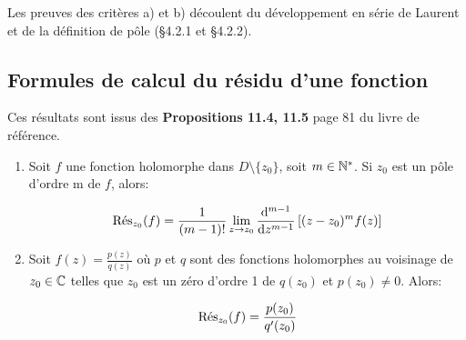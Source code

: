 \begin{remark}
    Les preuves des critères a) et b) découlent du développement en série de Laurent et de la définition de pôle (§4.2.1 et §4.2.2).
\end{remark}

\subsection{Formules de calcul du résidu d'une fonction}

\begin{note}
    Ces résultats sont issus des \textbf{Propositions 11.4, 11.5} page 81 du livre de référence.
\end{note}

\begin{method}\hfill
    
    \begin{enumerate}[label=\alph*)]
    \item 
    Soit $f$ une fonction holomorphe dans $D\setminus \{ z_0 \}$, soit $m \in \N^\ast$.
    Si $z_0$ est un pôle d'ordre m de $f$, alors:
    
    \[ \Res_{z_0}(f) = \frac{1}{(m - 1)!} \lim\limits_{z \rightarrow z_0} \frac{\dd^{m-1}}{\dz^{m - 1}} \left[ (z - z_0)^m f(z) \right] \]
    
    \item 
    Soit $f(z) = \frac{p(z)}{q(z)}$ où $p$ et $q$ sont des fonctions holomorphes au voisinage de $z_0 \in \Cx$ telles que $z_0$ est un zéro d'ordre 1 de $q(z_0)$ et $p(z_0) \neq 0$.
    Alors:
    
    \[ \Res_{z_0}(f) = \frac{p(z_0)}{q'(z_0)} \]
    \end{enumerate}
\end{method}

